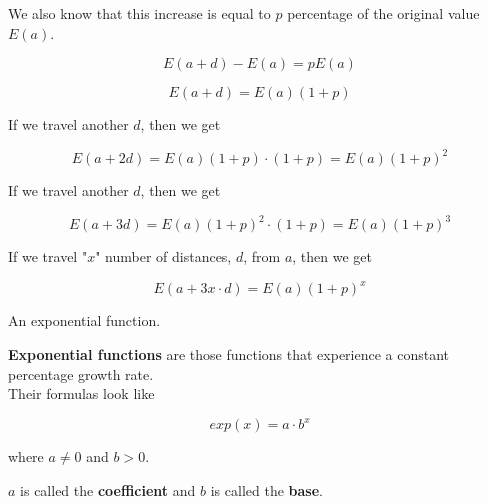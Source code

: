 \documentclass{ximera}
\begin{document}
We also know that this increase is equal to $p$ percentage of the original value $E(a)$.



\[
E(a+d) - E(a) = p E(a)
\]

\[
E(a+d) = E(a) (1+p)
\]

If we travel another $d$, then we get


\[
E(a + 2d) = E(a)(1+p) \cdot (1+p) = E(a) (1+p)^2
\]


If we travel another $d$, then we get


\[
E(a + 3d) = E(a)(1+p)^2 \cdot (1+p) = E(a) (1+p)^3
\]



If we travel "$x$" number of distances, $d$, from $a$, then we get

\[
E(a + 3x \cdot d) = E(a)(1+p)^x 
\]

An exponential function.



\begin{definition}
\textbf{Exponential functions} are those functions that experience a constant percentage growth rate. \\


Their formulas look like

\[
exp(x) = a \cdot b^x
\]


where $a \ne 0$ and $b > 0$.

$a$ is called the \textbf{coefficient} and $b$ is called the \textbf{base}.

\end{definition}
\end{document}
